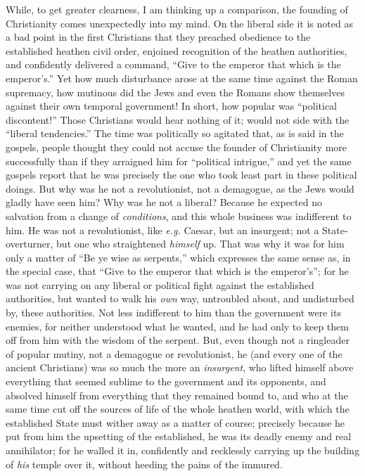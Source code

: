 While, to get greater clearness, I am thinking up a comparison, the founding 
of Christianity comes unexpectedly into my mind. On the liberal side it is 
noted as a bad point in the first Christians that they preached obedience to 
the established heathen civil order, enjoined recognition of the heathen 
authorities, and confidently delivered a command, ``Give to the emperor that 
which is the emperor's.'' Yet how much disturbance arose at the same time 
against the Roman supremacy, how mutinous did the Jews and even the Romans 
show themselves against their own temporal government! In short, how popular 
was ``political discontent!'' Those Christians would hear nothing of it; 
would not side with the ``liberal tendencies.'' The time was politically so 
agitated that, as is said in the gospels, people thought they could not accuse 
the founder of Christianity more successfully than if they arraigned him for 
``political intrigue,'' and yet the same gospels report that he was 
precisely the one who took least part in these political doings. But why was 
he not a revolutionist, not a demagogue, as the Jews would gladly have seen 
him? Why was he not a liberal? Because he expected no salvation from a change 
of \textit{conditions}, and this whole business was indifferent to him. He was 
not a revolutionist, like \textit{e.g.} Caesar, but an insurgent; not a 
State-overturner, but one who straightened \textit{himself} up. That was why 
it was for him only a matter of ``Be ye wise as serpents,'' which expresses 
the same sense as, in the special case, that ``Give to the emperor that which 
is the emperor's''; for he was not carrying on any liberal or political fight 
against the established authorities, but wanted to walk his \textit{own} way, 
untroubled about, and undisturbed by, these authorities. Not less indifferent 
to him than the government were its enemies, for neither understood what he 
wanted, and he had only to keep them off from him with the wisdom of the 
serpent. But, even though not a ringleader of popular mutiny, not a demagogue 
or revolutionist, he (and every one of the ancient Christians) was so much the 
more an \textit{insurgent}, who lifted himself above everything that seemed 
sublime to the government and its opponents, and absolved himself from 
everything that they remained bound to, and who at the same time cut off the 
sources of life of the whole heathen world, with which the established State 
must wither away as a matter of course; precisely because he put from him the 
upsetting of the established, he was its deadly enemy and real annihilator; 
for he walled it in, confidently and recklessly carrying up the building of 
\textit{his} temple over it, without heeding the pains of the immured.

